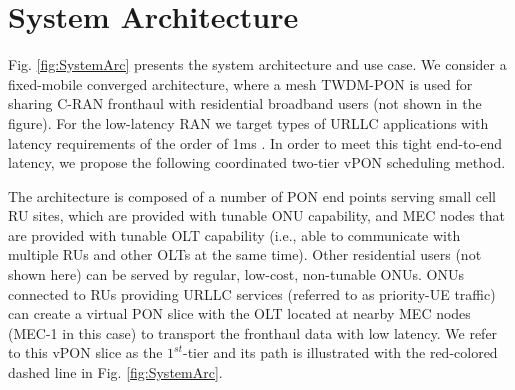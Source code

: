 \documentclass[a4paper, oneside, twocolumn, notitlepage, 10pt]{extarticle_ecoc}
\begin{document}
\section{System Architecture} \label{sec:SystemModel}
	Fig. \ref{fig:SystemArc} presents the system architecture and use case. We consider a fixed-mobile converged architecture, where a mesh TWDM-PON is used for sharing C-RAN fronthaul with residential broadband users (not shown in the figure). For the low-latency RAN we target types of URLLC applications with latency requirements of the order of 1ms \cite{5G-NGMN-Verticals}. In order to meet this tight end-to-end latency, we propose the following coordinated two-tier vPON scheduling method.
	
	The architecture is composed of a number of PON end points serving small cell RU sites, which are provided with tunable ONU capability, and MEC nodes that are provided with tunable OLT capability (i.e., able to communicate with multiple RUs and other OLTs at the same time). Other residential users (not shown here) can be served by regular, low-cost, non-tunable ONUs. %
	ONUs connected to RUs providing URLLC services (referred to as priority-UE traffic) can create a virtual PON slice with the OLT located at nearby MEC nodes (MEC-1 in this case) to transport the fronthaul data with low latency. We refer to this vPON slice as the $1^{st}$-tier and its path is illustrated with the red-colored dashed line in Fig. \ref{fig:SystemArc}.
	
\end{document}
